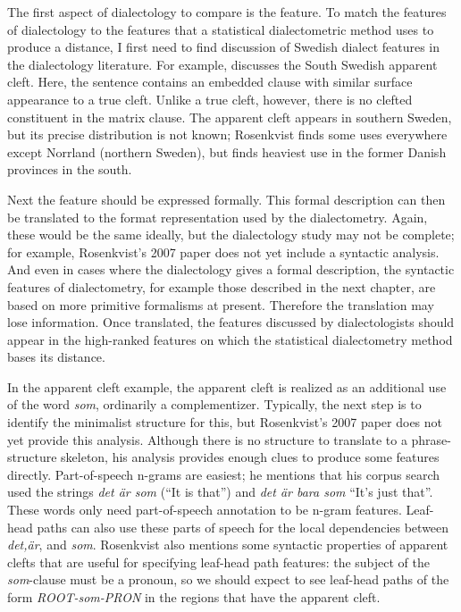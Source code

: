 The first aspect of dialectology to compare is the feature. To match the
features of dialectology to the features that a statistical
dialectometric method uses to produce a distance, I first need to find
discussion of Swedish dialect features in the dialectology
literature. For example,  discusses the South
Swedish apparent cleft. Here, the sentence contains an embedded clause
with similar surface appearance to a true cleft. Unlike a true cleft,
however, there is no clefted constituent in the matrix clause. The
apparent cleft appears in southern Sweden, but its precise
distribution is not known; Rosenkvist finds some uses everywhere
except Norrland (northern Sweden), but finds heaviest use in the
former Danish provinces in the south.


Next the feature should be expressed formally. This
formal description can then be translated to the format representation
used by the dialectometry. Again, these would be the same ideally, but
the dialectology study may not be complete; for example, Rosenkvist's
2007 paper does not yet include a syntactic analysis. And even in
cases where the dialectology gives a formal description, the syntactic
features of dialectometry, for example those described in the next
chapter, are based on more primitive formalisms at present. Therefore
the translation may lose information. Once translated, the features
discussed by dialectologists should appear in the high-ranked features
on which the statistical dialectometry method bases its distance.

In the apparent cleft example, the apparent cleft is realized as an
additional use of the word {\it som}, ordinarily a
complementizer. Typically, the next step is to identify the minimalist
structure for this, but Rosenkvist's 2007 paper does not yet provide
this analysis. Although there is no structure to translate to a
phrase-structure skeleton, his analysis provides enough clues to
produce some features directly. Part-of-speech n-grams are easiest; he
mentions that his corpus search used the strings {\it det \"ar som}
(``It is that'') and {\it det \"ar bara som} ``It's just that''. These
words only need part-of-speech annotation to be n-gram
features. Leaf-head paths can also use these parts of speech for the
local dependencies between {\it det,\"ar}, and {\it som}. Rosenkvist
also mentions some syntactic properties of apparent clefts that are
useful for specifying leaf-head path features: the subject of the {\it
  som}-clause must be a pronoun, so we should expect to see leaf-head
paths of the form {\it ROOT-som-PRON} in the regions that have the
apparent cleft.

